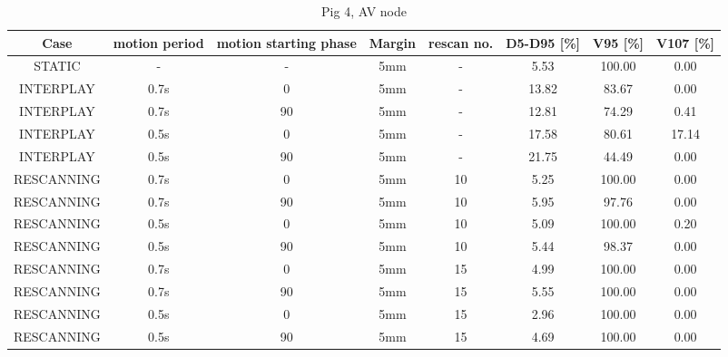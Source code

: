 \documentclass[type=dr, dr=rernat, accentcolor=tud7b,colorbacktitle, bigchapter, openright, twoside, 12pt ]{tudthesis}
\begin{document}
\begin{table}[H]
  \centering
  \tiny
  \caption{Pig 4, AV node}
  \begin{tabular}{|c||c|c|c|c||c|c|c|}
    \hline\hline
    Case & motion period & motion starting phase & Margin & rescan no. & D5-D95 [\%] & V95 [\%] & V107 [\%] \\
    \hline 
STATIC & - & - & 5mm & - & 5.53 & 100.00 & 0.00\\
INTERPLAY & 0.7s & 0 & 5mm & - & 13.82 & 83.67 & 0.00\\
INTERPLAY & 0.7s & 90 & 5mm & - & 12.81 & 74.29 & 0.41\\
INTERPLAY & 0.5s & 0 & 5mm & - & 17.58 & 80.61 & 17.14\\
INTERPLAY & 0.5s & 90 & 5mm & - & 21.75 & 44.49 & 0.00\\
RESCANNING & 0.7s & 0 & 5mm & 10 & 5.25 & 100.00 & 0.00\\
RESCANNING & 0.7s & 90 & 5mm & 10 & 5.95 & 97.76 & 0.00\\
RESCANNING & 0.5s & 0 & 5mm & 10 & 5.09 & 100.00 & 0.20\\
RESCANNING & 0.5s & 90 & 5mm & 10 & 5.44 & 98.37 & 0.00\\
RESCANNING & 0.7s & 0 & 5mm & 15 & 4.99 & 100.00 & 0.00\\
RESCANNING & 0.7s & 90 & 5mm & 15 & 5.55 & 100.00 & 0.00\\
RESCANNING & 0.5s & 0 & 5mm & 15 & 2.96 & 100.00 & 0.00\\
RESCANNING & 0.5s & 90 & 5mm & 15 & 4.69 & 100.00 & 0.00\\
    \hline\hline 
  \end{tabular}
  \label{tab:Pig4_AV}
\end{table}
\end{document}
